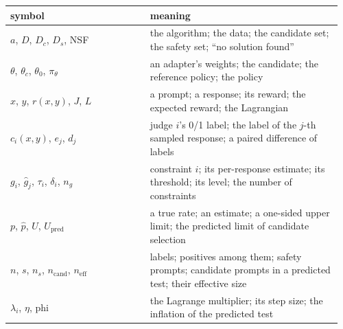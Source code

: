 \documentclass[11pt]{article}
\begin{document}
\begingroup\footnotesize\setlength{\tabcolsep}{4pt}
\begin{longtable}{@{}>{\raggedright\arraybackslash}p{0.406\linewidth}>{\raggedright\arraybackslash}p{0.558\linewidth}@{}}
\toprule
\textbf{\hspace{0pt}symbol} & \textbf{\hspace{0pt}meaning} \\
\midrule
\endhead
\bottomrule
\endlastfoot
\hspace{0pt}$a$, $D$, $D_{c}$, $D_{s}$, NSF & \hspace{0pt}the algorithm; the data; the candidate set; the safety set; ``no solution found'' \\
\hspace{0pt}$\theta$, $\theta_{c}$, $\theta_{0}$, $\pi_{\theta}$ & \hspace{0pt}an adapter's weights; the candidate; the reference policy; the policy \\
\hspace{0pt}$x$, $y$, $r (x , y )$, $J$, $L$ & \hspace{0pt}a prompt; a response; its reward; the expected reward; the Lagrangian \\
\hspace{0pt}$c_{i} (x , y )$, $e_{j}$, $d_{j}$ & \hspace{0pt}judge $i$'s 0/1 label; the label of the $j$-th sampled response; a paired difference of labels \\
\hspace{0pt}$g_{i}$, $\hat{g}_{j}$, $\tau_{i}$, $\delta_{i}$, $n_{g}$ & \hspace{0pt}constraint $i$; its per-response estimate; its threshold; its level; the number of constraints \\
\hspace{0pt}$p$, $\hat{p}$, $U$, $U_{\mathrm{pred}}$ & \hspace{0pt}a true rate; an estimate; a one-sided upper limit; the predicted limit of candidate selection \\
\hspace{0pt}$n$, $s$, $n_{s}$, $n_{\mathrm{cand}}$, $n_{\mathrm{eff}}$ & \hspace{0pt}labels; positives among them; safety prompts; candidate prompts in a predicted test; their effective size \\
\hspace{0pt}$\lambda_{i}$, $\eta$, $\text{phi}$ & \hspace{0pt}the Lagrange multiplier; its step size; the inflation of the predicted test \\

\end{longtable}
\end{document}
